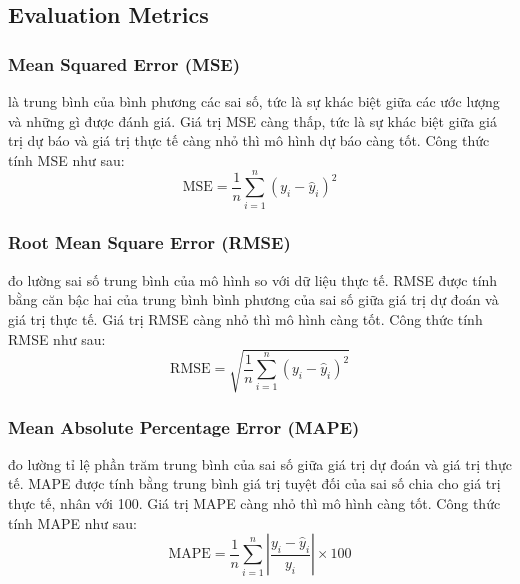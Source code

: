 \subsection{Evaluation Metrics} 
\subsubsection{Mean Squared Error (MSE)} là trung bình của bình phương các sai số, tức là sự khác biệt giữa các ước lượng và những gì được đánh giá. Giá trị MSE càng thấp, tức là sự khác biệt giữa giá trị dự báo và giá trị thực tế càng nhỏ thì mô hình dự báo càng tốt. Công thức tính MSE như sau:
\[
\text{MSE} = \frac{1}{n} \sum_{i=1}^{n} (y_i - \hat{y}_i)^2
\]
\subsubsection{Root Mean Square Error (RMSE)} đo lường sai số trung bình của mô hình so với dữ liệu thực tế. RMSE được tính bằng căn bậc hai của trung bình bình phương của sai số giữa giá trị dự đoán và giá trị thực tế. Giá trị RMSE càng nhỏ thì mô hình càng tốt. Công thức tính RMSE như sau:
\[
\text{RMSE} = \sqrt{\frac{1}{n} \sum_{i=1}^{n} (y_i - \hat{y}_i)^2}
\]
\subsubsection{Mean Absolute Percentage Error (MAPE)} đo lường tỉ lệ phần trăm trung bình của sai số giữa giá trị dự đoán và giá trị thực tế. MAPE được tính bằng trung bình giá trị tuyệt đối của sai số chia cho giá trị thực tế, nhân với 100. Giá trị MAPE càng nhỏ thì mô hình càng tốt. Công thức tính MAPE như sau:
\[
\text{MAPE} = \frac{1}{n} \sum_{i=1}^{n} \left| \frac{y_i - \hat{y}_i}{y_i} \right| \times 100
\]
